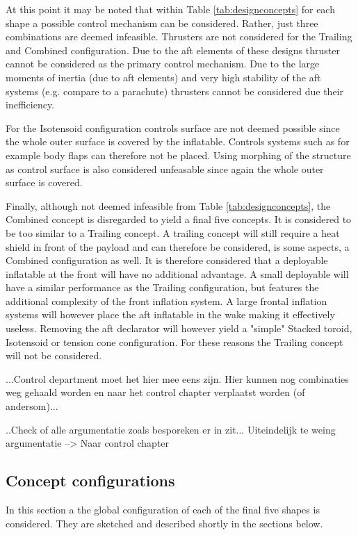 At this point it may be noted that within Table \ref{tab:designconcepts} for each shape a possible control mechanism can be considered. Rather, just three combinations are deemed infeasible. Thrusters are not considered for the Trailing and Combined configuration. Due to the aft elements of these designs thruster cannot be considered as the primary control mechanism. Due to the large moments of inertia (due to aft elements) and very high stability of the aft systems (e.g. compare to a parachute) thrusters cannot be considered due their inefficiency. 

For the Isotensoid configuration controls surface are not deemed possible since the whole outer surface is covered by the inflatable. Controls systems such as for example body flaps can therefore not be placed. Using morphing of the structure as control surface is also considered unfeasable since again the whole outer surface is covered. 

Finally, although not deemed infeasible from Table \ref{tab:designconcepts}, the Combined concept is disregarded to yield a final five concepts. It is considered to be too similar to a Trailing concept. A trailing concept will still require a heat shield in front of the payload and can therefore be considered, is some aspects, a Combined configuration as well. It is therefore considered that a deployable inflatable at the front will have no additional advantage. A small deployable will have a similar performance as the Trailing configuration, but features the additional complexity of the front inflation system. A large frontal inflation systems will however place the aft inflatable in the wake making it effectively useless. Removing the aft declarator will however yield a "simple" Stacked toroid, Isotensoid or tension cone configuration. For these reasons the Trailing concept will not be considered. 


...Control department moet het hier mee eens zijn. Hier kunnen nog combinaties weg gehaald worden en naar het control chapter verplaatst worden (of andersom)... 

..Check of alle argumentatie zoals besporeken er in zit... Uiteindelijk te weing argumentatie --> Naar control chapter

\subsection{Concept configurations} \label{sec:conf}

In this section a the global configuration of each of the final five shapes is considered. They are sketched and described shortly in the sections below.

